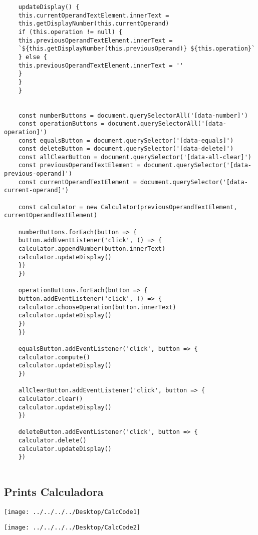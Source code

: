\begin{lstlisting}
    updateDisplay() {
    this.currentOperandTextElement.innerText =
    this.getDisplayNumber(this.currentOperand)
    if (this.operation != null) {
    this.previousOperandTextElement.innerText =
    `${this.getDisplayNumber(this.previousOperand)} ${this.operation}`
    } else {
    this.previousOperandTextElement.innerText = ''
    }
    }
    }
    
    
    const numberButtons = document.querySelectorAll('[data-number]')
    const operationButtons = document.querySelectorAll('[data-operation]')
    const equalsButton = document.querySelector('[data-equals]')
    const deleteButton = document.querySelector('[data-delete]')
    const allClearButton = document.querySelector('[data-all-clear]')
    const previousOperandTextElement = document.querySelector('[data-previous-operand]')
    const currentOperandTextElement = document.querySelector('[data-current-operand]')
    
    const calculator = new Calculator(previousOperandTextElement, currentOperandTextElement)
    
    numberButtons.forEach(button => {
    button.addEventListener('click', () => {
    calculator.appendNumber(button.innerText)
    calculator.updateDisplay()
    })
    })
    
    operationButtons.forEach(button => {
    button.addEventListener('click', () => {
    calculator.chooseOperation(button.innerText)
    calculator.updateDisplay()
    })
    })
    
    equalsButton.addEventListener('click', button => {
    calculator.compute()
    calculator.updateDisplay()
    })
    
    allClearButton.addEventListener('click', button => {
    calculator.clear()
    calculator.updateDisplay()
    })
    
    deleteButton.addEventListener('click', button => {
    calculator.delete()
    calculator.updateDisplay()
    })
    
    \end{lstlisting}
    
    \subsection{Prints Calculadora}
	
	\texttt{[image: ../../../../Desktop/CalcCode1]}
	
	
	\texttt{[image: ../../../../Desktop/CalcCode2]}
	

